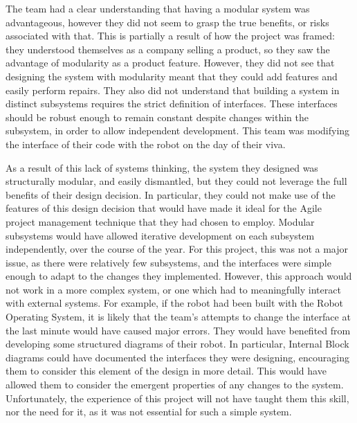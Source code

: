         The team had a clear understanding that having a modular system was advantageous, however they did not seem to grasp the true benefits, or risks associated with that.
        This is partially a result of how the project was framed: they understood themselves as a company selling a product, so they saw the advantage of modularity as a product feature.
        However, they did not see that designing the system with modularity meant that they could add features and easily perform repairs.
        They also did not understand that building a system in distinct subsystems requires the strict definition of interfaces.
        These interfaces should be robust enough to remain constant despite changes within the subsystem, in order to allow independent development.
        This team was modifying the interface of their code with the robot on the day of their viva.

        As a result of this lack of systems thinking, the system they designed was structurally modular, and easily dismantled, but they could not leverage the full benefits of their design decision.
        In particular, they could not make use of the features of this design decision that would have made it ideal for the Agile project management technique that they had chosen to employ.
        Modular subsystems would have allowed iterative development on each subsystem independently, over the course of the year.
        For this project, this was not a major issue, as there were relatively few subsystems, and the interfaces were simple enough to adapt to the changes they implemented.
        However, this approach would not work in a more complex system, or one which had to meaningfully interact with external systems.
        For example, if the robot had been built with the Robot Operating System, it is likely that the team's attempts to change the interface at the last minute would have caused major errors.
        They would have benefited from developing some structured diagrams of their robot.
        In particular, Internal Block diagrams could have documented the interfaces they were designing, encouraging them to consider this element of the design in more detail.
        This would have allowed them to consider the emergent properties of any changes to the system.
        Unfortunately, the experience of this project will not have taught them this skill, nor the need for it, as it was not essential for such a simple system.

